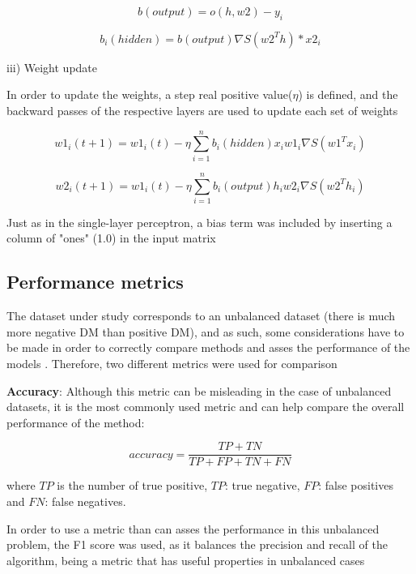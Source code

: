 \documentclass[10pt,twocolumn,letterpaper]{article}
\begin{document}
\begin{equation}
b(output) = o(h,w2) - y_i
\end{equation}

\begin{equation}
b_i(hidden) = b(output) \nabla S(w2^T h)*x2_i
\end{equation}

iii) Weight update

In order to update the weights, a step real positive value($\eta$) is defined, and the backward passes of the respective layers are used to update each set of weights

\begin{equation}
w1_i(t+1) = w1_i(t) - \eta \sum_{i=1}^{n} b_i(hidden) x_i w1_i \nabla S(w1^T x_i)
\end{equation}

\begin{equation}
w2_i(t+1) = w1_i(t) - \eta \sum_{i=1}^{n} b_i(output) h_i w2_i \nabla S(w2^T h_i)
\end{equation}

Just as in the single-layer perceptron, a bias term was included by inserting a column of "ones" (1.0) in the input matrix

\subsection{Performance metrics}

The dataset under study corresponds to an unbalanced dataset (there is much more negative DM than positive DM), and as such, some considerations have to be made in order to correctly compare methods and asses the performance of the models \cite{Hoens2013}. Therefore, two different metrics were used for comparison

\textbf{Accuracy}: Although this metric can be misleading in the case of unbalanced datasets, it is the most commonly used metric \cite{Hoens2013} and can help compare the overall performance of the method:

\begin{equation}
accuracy = \frac{TP+TN}{TP+FP+TN+FN}
\end{equation}

where $TP$ is the number of true positive, $TP$: true negative, $FP$: false positives and $FN$: false negatives.

In order to use a metric than can asses the performance in this unbalanced problem, the F1 score was used, as it balances the precision and recall of the algorithm, being a metric that has useful properties in unbalanced cases \cite{Hoens2013}
\end{document}
